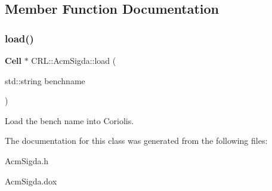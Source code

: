 \subsection{Member Function Documentation}
\mbox{\label{classCRL_1_1AcmSigda_a5e61fb60049f5a2dca1f2ca05fd5857a}} 
\subsubsection{\texorpdfstring{load()}{load()}}
{\footnotesize\ttfamily \textbf{ Cell} $\ast$ C\+R\+L\+::\+Acm\+Sigda\+::load (\begin{DoxyParamCaption}\item[{std\+::string}]{benchname }\end{DoxyParamCaption})\hspace{0.3cm}{\ttfamily [static]}}

Load the bench {\ttfamily name} into Coriolis. 

The documentation for this class was generated from the following files\+:\begin{DoxyCompactItemize}
\item 
Acm\+Sigda.\+h\item 
Acm\+Sigda.\+dox\end{DoxyCompactItemize}

